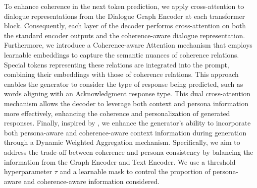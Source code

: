 \documentclass[letterpaper]{article} %
\begin{document}

To enhance coherence in the next token prediction, we apply cross-attention to dialogue representations from the Dialogue Graph Encoder at each transformer block. Consequently, each layer of the decoder performs cross-attention on both the standard encoder outputs and the coherence-aware dialogue representation. Furthermore, we introduce a Coherence-aware Attention mechanism that employs learnable embeddings to capture the semantic nuances of coherence relations. Special tokens representing these relations are integrated into the prompt, combining their embeddings with those of coherence relations. This approach enables the generator to consider the type of response being predicted, such as words aligning with an Acknowledgment response type. This dual cross-attention mechanism allows the decoder to leverage both context and persona information more effectively, enhancing the coherence and personalization of generated responses. Finally, inspired by \cite{huang-etal-2023-paa}, we enhance the generator's ability to incorporate both persona-aware and coherence-aware context information during generation through a Dynamic Weighted Aggregation mechanism. Specifically, we aim to address the trade-off between coherence and persona consistency by balancing the information from the Graph Encoder and Text Encoder. We use a threshold hyperparameter $\tau$ and a learnable mask to control the proportion of persona-aware and coherence-aware information considered.
\end{document}
